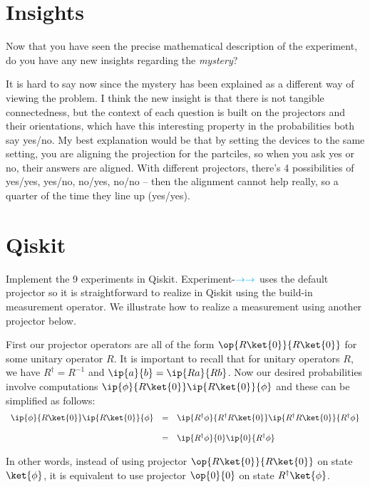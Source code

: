 \documentclass{article}
\newcommand{\xplus}{{\color{cyan}\rightarrow}}
\theoremstyle{remark}
\begin{document}

\section{Insights}

Now that you have seen the precise mathematical description of
  the experiment, do you have any new insights regarding the \emph{mystery}?

It is hard to say now since the mystery has been explained as a different way of viewing
the problem. I think the new insight is that there is not tangible connectedness,
but the context of each question is built on the projectors and their orientations,
which have this interesting property in the probabilities both say yes/no. 
My best explanation would be that by setting the devices to the same setting,
you are aligning the projection for the partciles, so when you ask yes or no, their
answers are aligned. With different projectors, there's 4 possibilities of yes/yes, yes/no, no/yes, no/no -- then the alignment cannot help really, so a quarter of the time they
line up (yes/yes). 

\section{Qiskit}
Implement the 9 experiments in Qiskit. Experiment-$\xplus\xplus$
  uses the default projector so it is straightforward to realize in
  Qiskit using the build-in measurement operator. We illustrate how to
  realize a measurement using another projector below.


  First our projector operators are all of the form
  $\op{R\ket{0}}{R\ket{0}}$ for some unitary operator $R$. It is
  important to recall that for unitary operators $R$, we have
  $R^\dagger = R^{-1}$ and $\ip{a}{b} = \ip{Ra}{Rb}$. Now our desired
  probabilities involve computations
  $\ip{\phi}{R\ket{0}}\ip{R\ket{0}}{\phi}$ and these can be simplified
  as follows:
  \[\begin{array}{rcl}
      \ip{\phi}{R\ket{0}}\ip{R\ket{0}}{\phi} &=&
        \ip{R^\dagger\phi}{R^\dagger R\ket{0}}\ip{R^\dagger R\ket{0}}{R^\dagger\phi} \\
\\
&=& \ip{R^\dagger\phi}{0}\ip{0}{R^\dagger\phi} 
 \end{array}\]

In other words, instead of using projector $\op{R\ket{0}}{R\ket{0}}$ on
state $\ket{\phi}$, it is equivalent to use projector $\op{0}{0}$ on
state $R^\dagger\ket{\phi}$. 



\end{document}
